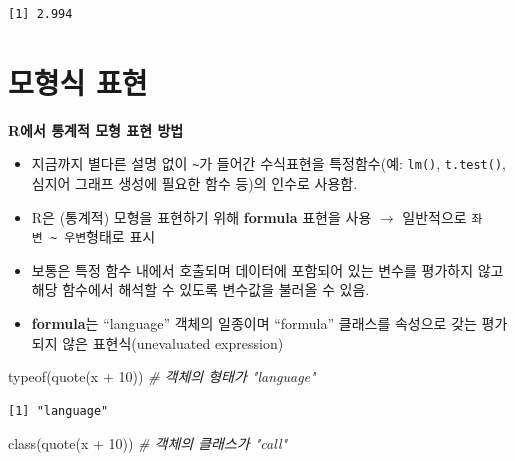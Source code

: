 \documentclass[
  11pt,
]{krantz}
\makeatletter
\newenvironment{Shaded}{\begin{snugshade}}{\end{snugshade}}
\newcommand{\CommentTok}[1]{\textcolor[rgb]{0.37,0.37,0.37}{\textit{#1}}}
\newcommand{\DecValTok}[1]{\textcolor[rgb]{0.06,0.06,0.06}{#1}}
\newcommand{\FunctionTok}[1]{\textcolor[rgb]{0,0,0}{#1}}
\newcommand{\NormalTok}[1]{#1}
\newcommand{\SpecialCharTok}[1]{\textcolor[rgb]{0,0,0}{#1}}
\providecommand{\tightlist}{%
  \setlength{\itemsep}{0pt}\setlength{\parskip}{0pt}}
\newenvironment{kframe}{%
\medskip{}
\setlength{\fboxsep}{.8em}
 \def\at@end@of@kframe{}%
 \ifinner\ifhmode%
  \def\at@end@of@kframe{\end{minipage}}%
  \begin{minipage}{\columnwidth}%
 \fi\fi%
 \def\FrameCommand##1{\hskip\@totalleftmargin \hskip-\fboxsep
 \colorbox{shadecolor}{##1}\hskip-\fboxsep
     \hskip-\linewidth \hskip-\@totalleftmargin \hskip\columnwidth}%
 \MakeFramed {\advance\hsize-\width
   \@totalleftmargin\z@ \linewidth\hsize
   \@setminipage}}%
 {\par\unskip\endMakeFramed%
 \at@end@of@kframe}
\newenvironment{rmdblock}[1]
  {
  \begin{itemize}
  \renewcommand{\labelitemi}{
    \raisebox{-.7\height}[0pt][0pt]{
      {\setkeys{Gin}{width=3em,keepaspectratio}\texttt{[image: images/\#1]}}
    }
  }
  \setlength{\fboxsep}{1em}
  \begin{kframe}
  \item
  }
  {
  \end{kframe}
  \end{itemize}
  }
\newenvironment{rmdtip}
  {\begin{rmdblock}{tip}}
  {\end{rmdblock}}
\makeatother
\begin{document}
\begin{verbatim}
[1] 2.994
\end{verbatim}

\normalsize

\hypertarget{uxbaa8uxd615uxc2dd-uxd45cuxd604}{%
\section{모형식 표현}\label{uxbaa8uxd615uxc2dd-uxd45cuxd604}}

\footnotesize

\begin{rmdtip}
\textbf{R에서 통계적 모형 표현 방법}

\begin{itemize}
\tightlist
\item
  지금까지 별다른 설명 없이 \texttt{\textasciitilde{}}가 들어간 수식표현을 특정함수(예: \texttt{lm()}, \texttt{t.test()}, 심지어 그래프 생성에 필요한 함수 등)의 인수로 사용함.
\item
  R은 (통계적) 모형을 표현하기 위해 \textbf{formula} 표현을 사용 \(\rightarrow\) 일반적으로 \texttt{좌변\ \textasciitilde{}\ 우변}형태로 표시
\item
  보통은 특정 함수 내에서 호출되며 데이터에 포함되어 있는 변수를 평가하지 않고 해당 함수에서 해석할 수 있도록 변수값을 불러올 수 있음.
\item
  \textbf{formula}는 ``language'' 객체의 일종이며 ``formula'' 클래스를 속성으로 갖는 평가되지 않은 표현식(unevaluated expression)
\end{itemize}
\end{rmdtip}

\normalsize

\footnotesize

\begin{Shaded}
\begin{Highlighting}[]
\FunctionTok{typeof}\NormalTok{(}\FunctionTok{quote}\NormalTok{(x }\SpecialCharTok{+} \DecValTok{10}\NormalTok{)) }\CommentTok{\# 객체의 형태가 "language"}
\end{Highlighting}
\end{Shaded}

\begin{verbatim}
[1] "language"
\end{verbatim}

\begin{Shaded}
\begin{Highlighting}[]
\FunctionTok{class}\NormalTok{(}\FunctionTok{quote}\NormalTok{(x }\SpecialCharTok{+} \DecValTok{10}\NormalTok{)) }\CommentTok{\# 객체의 클래스가 "call"}
\end{Highlighting}
\end{Shaded}
\end{document}
